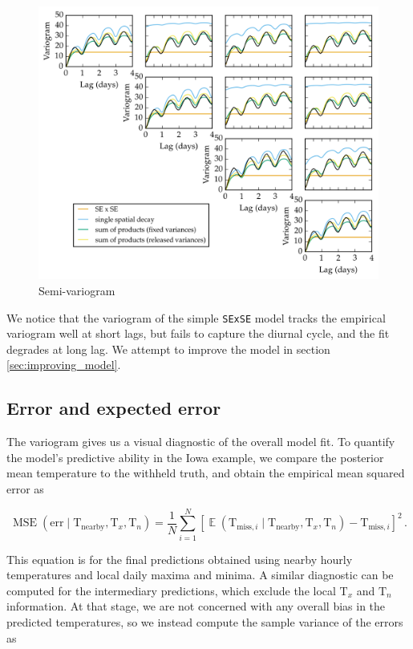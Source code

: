 \documentclass[letter]{article}
\makeatletter
\def\maxwidth{\ifdim\Gin@nat@width>\linewidth\linewidth
\else\Gin@nat@width\fi}
\let\Oldincludegraphics\includegraphics
\renewcommand{\includegraphics}[1]{\Oldincludegraphics[width=.8\maxwidth]{#1}}
\newcommand{\genericdel}[3]{%
      \left#1#3\right#2
    }
\newcommand{\del}[1]{\genericdel(){#1}}
\newcommand{\sbr}[1]{\genericdel[]{#1}}
\DeclareMathOperator{\E}{\mathbb{E}}
\DeclareMathOperator{\mse}{{MSE}}
\newcommand{\T}{\mathrm{T}}
\newcommand{\Tn}{\T_{n}}
\newcommand{\Tx}{\T_{x}}
\newcommand{\miss}{\mathrm{miss}}
\newcommand{\obs}{\mathrm{nearby}}
\newcommand{\error}{\mathrm{err}}
\makeatother
\begin{document}
\begin{figure}
\centering
\includegraphics{figures/spatial_variogram.png}
\caption{\label{fig:spatial_variogram} Semi-variogram}
\end{figure}
    


        We notice that the variogram of the simple \texttt{SExSE} model tracks the empirical variogram well at short lags, but fails to capture the diurnal cycle, and the fit degrades at long lag. We attempt to improve the model in section \ref{sec:improving_model}.
    


        \subsection{Error and expected error}\label{error-and-expected-error}

The variogram gives us a visual diagnostic of the overall model fit. To quantify the model's predictive ability in the Iowa example, we compare the posterior mean temperature to the withheld truth, and obtain the empirical mean squared error as

\begin{equation}
    \label{eq:mse}
    \mse\del{\error \mid \T_\obs,\Tx,\Tn} = \frac{1}{N} \sum_{i=1}^N \sbr{\E\del{\T_{\miss,i} \mid \T_\obs,\Tx,\Tn} - \T_{\miss,i}}^2\,.
\end{equation}

This equation is for the final predictions obtained using nearby hourly temperatures and local daily maxima and minima.
A similar diagnostic can be computed for the intermediary predictions, which exclude the local \(\Tx\) and \(\Tn\) information.
At that stage, we are not concerned with any overall bias in the predicted temperatures, so we instead compute the sample variance of the errors as
\end{document}

